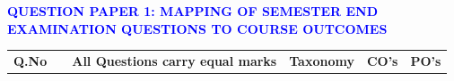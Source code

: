 \documentclass[11pt,paper=a4,answers]{exam}
\begin{document}
\flushleft\textbf{\textcolor{blue}{\large QUESTION PAPER 1:	MAPPING OF SEMESTER END EXAMINATION QUESTIONS TO COURSE OUTCOMES}}
\renewcommand{\arraystretch}{1.2}
\begin{flushleft}
	\begin{longtable}{|l|l|R{8cm}|R{1.7cm}|R{1.2cm}|R{1.3cm}|} 
		\hline
		\textbf{Q.No} &   &  \textbf{All Questions carry equal marks}                                                                                                                                                                                                                                                                                                                                                                                                                                                                                                    & \textbf{Taxonomy}  & \textbf{CO's} & \textbf{PO's}  \\ 
		

\end{longtable}
\end{flushleft}
\end{document}
